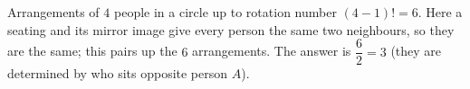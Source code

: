 Arrangements of $4$ people in a circle up to rotation number $(4-1)!=6$. Here a seating and its mirror image give every person the same two neighbours, so they are the same; this pairs up the $6$ arrangements. The answer is $\dfrac{6}{2}=\boxed{3}$ (they are determined by who sits opposite person $A$).

